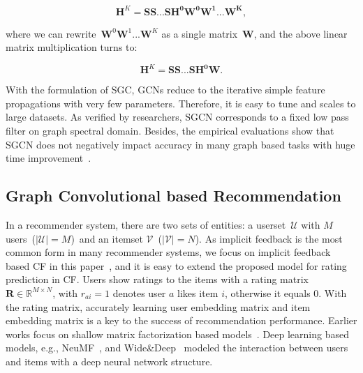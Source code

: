 \documentclass[letterpaper]{article} %
\newcommand{\Mat}[1]{\mathbf{#1}}
\begin{document}
\begin{small}
\vspace{-0.cm}
\begin{equation} \label{eqsgcn_1}
\mathbf{H}^{K}=\mathbf{\mathbf{S}\mathbf{S}...\mathbf{S}\mathbf{H^0}\Mat{W}^0\Mat{W}^1...\Mat{W}^K},
\end{equation} 
\end{small}


\noindent where we can rewrite~{\small$\Mat{W}^0\Mat{W}^1...\Mat{W}^K$} as a single matrix~$\Mat{W}$, and the above linear matrix multiplication turns to:

\begin{small}
\vspace{-0.2cm}
\begin{equation} \label{eqsgcn_1}
\mathbf{H}^{K}=\mathbf{\mathbf{S}\mathbf{S}...\mathbf{S}\mathbf{H^0}\Mat{W}}.
\end{equation} 
\end{small}

With the formulation of SGC, GCNs reduce to the iterative simple feature propagations with very few parameters. Therefore, it is easy to tune and scales to large datasets. As verified by researchers, SGCN corresponds to a fixed low pass filter on graph spectral domain. Besides, the empirical evaluations show that SGCN does not negatively impact accuracy in many graph based tasks with huge time improvement~\cite{ICML2019simplifying}.

 

\subsection{Graph Convolutional based Recommendation}
In a recommender system, there are two sets of entities: a userset~{\small$\mathcal{U}$} with {\small$M$} users~({\small{$|\mathcal{U}|\!=\!M$}})~and an itemset {\small$\mathcal{V}$}~({\small{$|\mathcal{V}|\!=\!N$}}). As implicit feedback is the most common form in many recommender systems, we focus on implicit feedback based CF in this paper~\cite{UAI2009bpr}, and it is easy to extend the proposed model for rating prediction in CF.
Users show ratings to the items with a rating matrix~{\small$\Mat{R}\in \mathbb{R}^{M\times N}$}, with $r_{ai}\!=\!1$  denotes user $a$ likes item $i$, otherwise it equals 0. With the rating matrix, accurately learning user embedding matrix and item embedding matrix is a key to the success of recommendation performance. Earlier works focus on shallow matrix factorization based models~\cite{koren2009matrix,UAI2009bpr}. Deep learning based models, e.g., NeuMF~\cite{WWW2017neural}, and Wide\&Deep~\cite{recsys2016wide} modeled the interaction between users and items with a deep neural network structure.
\end{document}

